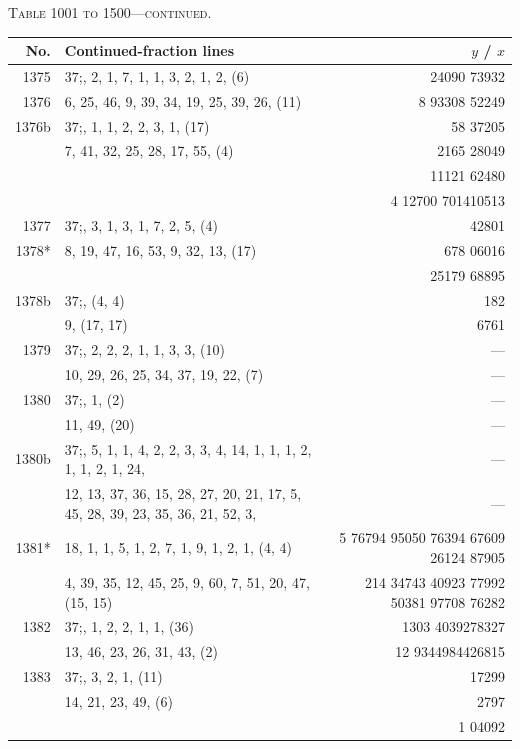 \documentclass[11pt]{article}
\newcommand{\peheading}{%
  \begin{center}\small\textsc{Table 1001 to 1500---continued.}\end{center}
}
\begin{document}
\peheading
\renewcommand{\arraystretch}{1.15}
{\footnotesize
\begin{longtable}{|r|p{8.5cm}|r|}
\hline
\textbf{No.} & \textbf{Continued-fraction lines} & \textbf{$y$ \;/\; $x$}\\
\hline\endhead
1375   & $37$;\; 12, 2, 1, 7, 1, 1, 3, 2, 1, 2, (6) & 24090 73932 \\
1376   & 6, 25, 46, 9, 39, 34, 19, 25, 39, 26, (11) & 8 93308 52249 \\
\hline
1376b  & $37$;\; 10, 1, 1, 2, 2, 3, 1, (17) & 58 37205 \\
       & 7, 41, 32, 25, 28, 17, 55, (4) & 2165 28049 \\
       & & 11121 62480 \\
       & & 4 12700 701410513 \\
\hline
1377   & $37$;\; 9, 3, 1, 3, 1, 7, 2, 5, (4) & 42801 \\
1378*  & 8, 19, 47, 16, 53, 9, 32, 13, (17) & 678 06016 \\
       & & 25179 68895 \\
\hline
1378b  & $37$;\; 8, (4, 4) & 182 \\
       & 9, (17, 17) & 6761 \\
\hline
1379   & $37$;\; 7, 2, 2, 2, 1, 1, 3, 3, (10) & --- \\
       & 10, 29, 26, 25, 34, 37, 19, 22, (7) & --- \\
\hline
1380   & $37$;\; 6, 1, (2) & --- \\
       & 11, 49, (20) & --- \\
\hline
1380b  & $37$;\; 6, 5, 1, 1, 4, 2, 2, 3, 3, 4, 14, 1, 1, 1, 2, 1, 1, 2, 1, 24, & --- \\
       & 12, 13, 37, 36, 15, 28, 27, 20, 21, 17, 5, 45, 28, 39, 23, 35, 36, 21, 52, 3, & --- \\
\hline
1381*  & 18, 1, 1, 5, 1, 2, 7, 1, 9, 1, 2, 1, (4, 4) & 5 76794 95050 76394 67609 26124 87905 \\
       & 4, 39, 35, 12, 45, 25, 9, 60, 7, 51, 20, 47, (15, 15) & 214 34743 40923 77992 50381 97708 76282 \\
\hline
1382   & $37$;\; 5, 1, 2, 2, 1, 1, (36) & 1303 4039278327 \\
       & 13, 46, 23, 26, 31, 43, (2) & 12 9344984426815 \\
\hline
1383   & $37$;\; 5, 3, 2, 1, (11) & 17299 \\
       & 14, 21, 23, 49, (6) & 2797 \\
       & & 1 04092 \\

\end{longtable}}
\end{document}
